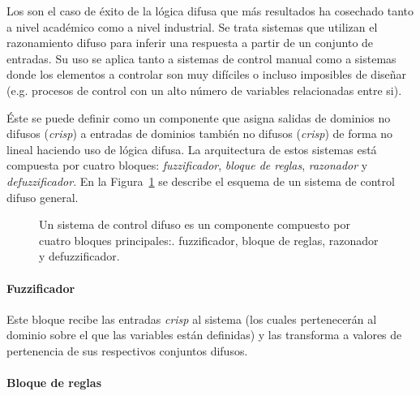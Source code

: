 Los  son el caso de éxito de la lógica difusa que más resultados ha cosechado tanto a nivel académico como a nivel industrial. Se trata sistemas que utilizan el razonamiento difuso para inferir una respuesta a partir de un conjunto de entradas. Su uso se aplica tanto a sistemas de control manual como a sistemas donde los elementos a controlar son muy difíciles o incluso imposibles de diseñar (e.g. procesos de control con un alto número de variables relacionadas entre si).

Éste se puede definir como un componente que asigna salidas de dominios no difusos (\textit{crisp}) a entradas de dominios también no difusos (\textit{crisp}) de forma no lineal haciendo uso de lógica difusa. La arquitectura de estos sistemas está compuesta por cuatro bloques: \textit{fuzzificador}, \textit{bloque de reglas}, \textit{razonador} y \textit{defuzzificador}. En la Figura~\ref{fig:fuzzy-control-system} se describe el esquema de un sistema de control difuso general.

\begin{figure}
	\centering
	\caption[Esquema de un sistema de control difuso]{Un sistema de control difuso es un componente compuesto por cuatro bloques principales:. fuzzificador, bloque de reglas, razonador y defuzzificador.}
	\label{fig:fuzzy-control-system}
\end{figure}

\paragraph{Fuzzificador}

Este bloque recibe las entradas \textit{crisp} al sistema (los cuales pertenecerán al dominio sobre el que las variables están definidas) y las transforma a valores de pertenencia de sus respectivos conjuntos difusos.

\paragraph{Bloque de reglas}

